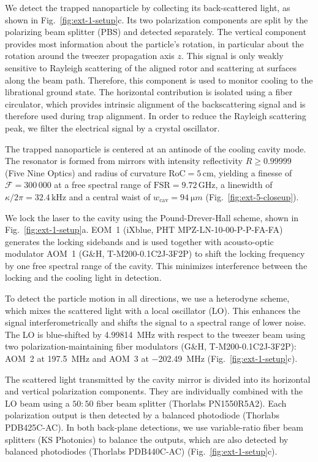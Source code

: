 \documentclass[reprint, amsmath, amssymb, superscriptaddress,showkeys,aps,pra]{revtex4-2}
\begin{document}
We detect the trapped nanoparticle by collecting its back-scattered light, as shown in Fig.~\ref{fig:ext-1-setup}c. Its two polarization components are split by the polarizing beam splitter (PBS) and detected separately. The vertical component provides most information about the particle's rotation, in particular about the rotation around the tweezer propagation axis $z$. This signal is only weakly sensitive to Rayleigh scattering of the aligned rotor and scattering at surfaces along the beam path. Therefore, this component is used to monitor cooling to the librational ground state.
The horizontal contribution is isolated using a fiber circulator, which provides intrinsic alignment of the backscattering signal and is therefore used during trap alignment. In order to reduce the Rayleigh scattering peak, we filter the electrical signal by a crystal oscillator.

The trapped nanoparticle is centered at an antinode of the cooling cavity mode. The resonator is formed from mirrors with intensity reflectivity  $R\geq0.99999$ (Five Nine Optics) and radius of curvature $\text{RoC} =5\,\text{cm}$, 
yielding a finesse of $\mathcal{F}=300\,000$ at a free spectral range of $\text{FSR} =9.72\,\text{GHz}$, a linewidth of $\kappa/2\pi=32.4\,\text{kHz}$ and a central waist of $w_\text{cav}=\qty{94}{\micro m}$ (Fig.~\ref{fig:ext-5-closeup}).

We lock the laser to the cavity using the Pound-Drever-Hall scheme, shown in Fig.~\ref{fig:ext-1-setup}a. EOM~1 (iXblue, PHT MPZ-LN-10-00-P-P-FA-FA) generates the locking sidebands and is used together with acousto-optic modulator AOM~1 (G\&H, T-M200-0.1C2J-3F2P) to shift the locking frequency by one free spectral range of the cavity. This minimizes interference between the locking and the cooling light in detection.

To detect the particle motion in all directions, we use a heterodyne scheme, which mixes the scattered light with a local oscillator (LO). This enhances the signal interferometrically and shifts the signal to a spectral range of lower noise. The LO is blue-shifted by \qty{4.99814}{MHz} with respect to the tweezer beam using two polarization-maintaining fiber modulators (G\&H, T-M200-0.1C2J-3F2P): AOM~2 at \qty{197.5}{MHz} and AOM~3 at \qty{-202.49}{MHz} (Fig.~\ref{fig:ext-1-setup}c).

The scattered light transmitted by the cavity mirror is divided into its horizontal and vertical polarization components. They are individually combined with the LO beam using a $50:50$ fiber beam splitter (Thorlabs PN1550R5A2). Each polarization output is then detected by a balanced photodiode (Thorlabs PDB425C-AC). In both back-plane detections, we use variable-ratio fiber beam splitters (KS Photonics) to balance the outputs, which are also detected by balanced photodiodes (Thorlabs PDB440C-AC) (Fig.~\ref{fig:ext-1-setup}c).
\end{document}
